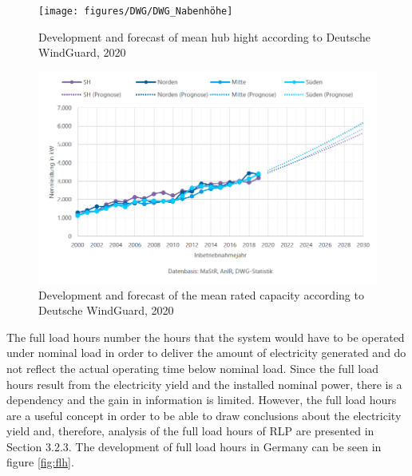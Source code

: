 \documentclass[a4paper,11pt]{article}
\begin{document}
\begin{figure}[H]

{\centering \texttt{[image: figures/DWG/DWG\_Nabenhöhe]} 

}

\caption{Development and forecast of mean hub hight according to Deutsche WindGuard, 2020}\label{fig:nabe}
\end{figure}
\begin{figure}[H]

{\centering \includegraphics[width=1\linewidth]{figures/DWG/DWG_Nennleistung} 

}

\caption{Development and forecast of the mean rated capacity according to Deutsche WindGuard, 2020}\label{fig:capacity}
\end{figure}
The full load hours number the hours that the system would have to be operated under nominal load in order to deliver the amount of electricity generated and do not reflect the actual operating time below nominal load. Since the full load hours result from the electricity yield and the installed nominal power, there is a dependency and the gain in information is limited. However, the full load hours are a useful concept in order to be able to draw conclusions about the electricity yield and, therefore, analysis of the full load hours of RLP are presented in Section 3.2.3. The development of full load hours in Germany can be seen in figure \ref{fig:flh}.
\end{document}
